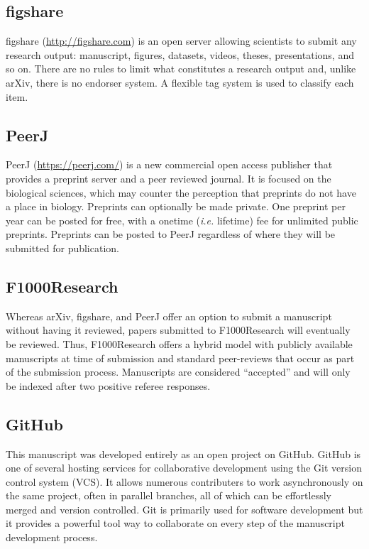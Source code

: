 \documentclass[10pt]{article}
\begin{document}
\subsection*{figshare}

figshare (\href{http://figshare.com}{http://figshare.com}) is an open server
allowing scientists to submit any research output: manuscript, figures,
datasets, videos, theses, presentations, and so on. There are no rules to limit
what constitutes a research output and, unlike arXiv, there is no endorser
system. A flexible tag system is used to classify each item.

\subsection*{PeerJ}

PeerJ (\href{https://peerj.com/}{https://peerj.com/}) is a new commercial open
access publisher that provides a preprint server and a peer reviewed journal. It
is focused on the biological sciences, which may counter the perception that
preprints do not have a place in biology. Preprints can optionally be made
private.  One preprint per year can be posted for free, with a onetime
(\emph{i.e.}  lifetime) fee for unlimited public preprints. Preprints can be
posted to PeerJ regardless of where they will be submitted for publication.

\subsection*{F1000Research}\label{f1000r}

Whereas arXiv, figshare, and PeerJ offer an option to submit a manuscript
without having it reviewed, papers submitted to F1000Research will eventually be
reviewed. Thus, F1000Research offers a hybrid model with publicly available
manuscripts at time of submission and standard peer-reviews that occur as part
of the submission process. Manuscripts are considered ``accepted'' and will only
be indexed after two positive referee responses.

\subsection*{GitHub}

This manuscript was developed entirely as an open project on GitHub. GitHub is
one of several hosting services for collaborative development using the Git
version control system (VCS). It allows numerous contributers to work
asynchronously on the same project, often in parallel branches, all of which can
be effortlessly merged and version controlled.  Git is primarily used for
software development \cite{aru12} but it provides a powerful tool way to
collaborate on every step of the manuscript development process.
\end{document}

